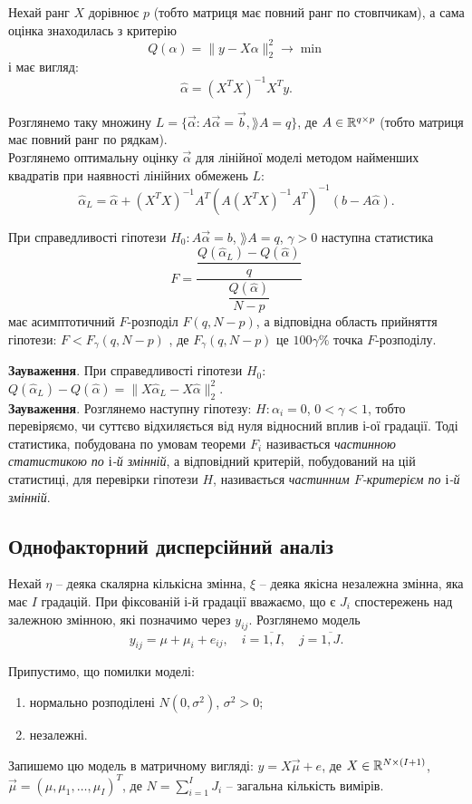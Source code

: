 Нехай ранг $X$ дорівнює $p$ (тобто матриця має повний ранг по стовпчикам), а сама оцінка знаходилась з критерію \[Q(\alpha)=\|y-X\alpha\|_2^2\to\min\] і має вигляд: \[\widehat \alpha = (X^TX)^{-1}X^Ty.\]

Розглянемо таку множину $L = \{\vec\alpha : A\vec\alpha = \vec b, \rang  A = q\}$, де $A \in \mathbb{R}^{q\times p}$ (тобто матриця має повний ранг по рядкам). \\

Розглянемо оптимальну оцінку $\vec\alpha$ для лінійної моделі методом найменших квадратів при наявності лінійних обмежень $L$: \[ \widehat\alpha_L=\widehat\alpha+(X^TX)^{-1}A^T(A(X^TX)^{-1}A^T)^{-1}(b-A\widehat{\alpha}). \]

\begin{theorem}
	При справедливості гіпотези $H_0:A\vec\alpha=b$, $\rang  A=q$, $\gamma>0$ наступна статистика \[ F = \dfrac{\dfrac{Q(\widehat{\alpha}_L)-Q(\widehat{\alpha})}{q}}{\dfrac{Q(\widehat{\alpha})}{N-p}}\] має асимптотичний $F$-розподіл $F(q, N - p)$, а відповідна область прийняття гіпотези: $F < F_\gamma (q, N - p)$ , де $F_\gamma (q, N - p)$ це $100\gamma\%$ точка $F$-розподілу.
\end{theorem}

\textbf{Зауваження}. При справедливості гіпотези $H_0$: $Q(\widehat{\alpha}_L)-Q(\widehat{\alpha})=\|X\widehat{\alpha}_L-X\widehat{\alpha}\|_2^2$. \\

\textbf{Зауваження}. Розглянемо наступну гіпотезу: $H: \alpha_i = 0$, $0<\gamma<1$, тобто перевіряємо, чи суттєво відхиляється від нуля відносний вплив $і$-ої градації. Тоді статистика, побудована по умовам теореми $F_i$ називається \textit{частинною статистикою по $і$-й змінній}, а відповідний критерій, побудований на цій статистиці, для перевірки гіпотези $H$, називається \textit{частинним $F$-критерієм по $і$-й змінній}.

\subsection{Однофакторний дисперсійний аналіз}

Нехай $\eta$ -- деяка скалярна кількісна змінна, $\xi$ -- деяка якісна незалежна змінна, яка має $I$ градацій. При фіксованій $і$-й градації вважаємо, що є $J_i$ спостережень над залежною змінною, які позначимо через $y_{ij}$. Розглянемо модель \[y_{ij}= \mu + \mu_i + e_{ij}, \quad i = \overline{1,I}, \quad j = \overline{1, J}. \]

Припустимо, що помилки моделі:
\begin{enumerate}
	\item нормально розподілені $N(0,\sigma^2)$, $\sigma^2 > 0$;
	\item незалежні.
\end{enumerate}

Запишемо цю модель в матричному вигляді: $y = X \vec\mu + e$, де $X \in \mathbb{R}^{N\times(I+1)}$, $\vec\mu=(\mu,\mu_1,\ldots,\mu_I)^T$, де $N = \sum_{i=1}^I J_i$ -- загальна кількість вимірів.
